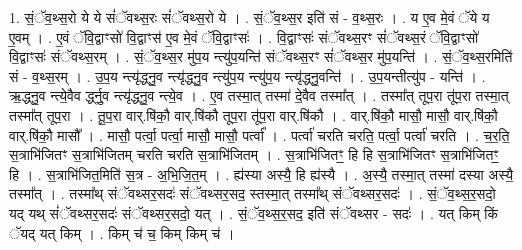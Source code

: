 \documentclass[17pt]{extarticle}
\begin{document}
1. सं॒ॅव॒थ्स॒रो ये ये सं॑ॅवथ्स॒रः सं॑ॅवथ्स॒रो ये । . सं॒ॅव॒थ्स॒र इति॑ सं - व॒थ्स॒रः । . य ए॒व मे॒वं ॅये य ए॒वम् । . ए॒वं ॅवि॒द्वाꣳसो॑ वि॒द्वाꣳस॑ ए॒व मे॒वं ॅवि॒द्वाꣳसः॑ । . वि॒द्वाꣳसः॑ संॅवथ्स॒रꣳ सं॑ॅवथ्स॒रं ॅवि॒द्वाꣳसो॑ वि॒द्वाꣳसः॑ संॅवथ्स॒रम् । . सं॒ॅव॒थ्स॒र मु॑प॒य न्त्यु॑प॒यन्ति॑ संॅवथ्स॒रꣳ सं॑ॅवथ्स॒र मु॑प॒यन्ति॑ । . सं॒ॅव॒थ्स॒रमिति॑ सं - व॒थ्स॒रम् । . उ॒प॒य न्त्यृ॑द्ध्नु॒व न्त्यृ॑द्ध्नु॒व न्त्यु॑प॒य न्त्यु॑प॒य न्त्यृ॑द्ध्नु॒वन्ति॑ । . उ॒प॒यन्तीत्यु॑प - यन्ति॑ । . ऋ॒द्ध्नु॒व न्त्ये॒वैव र्द्ध्नु॒व न्त्यृ॑द्ध्नु॒व न्त्ये॒व । . ए॒व तस्मा॒त् तस्मा॑ दे॒वैव तस्मा᳚त् । . तस्मा᳚त् तूप॒रा तू॑प॒रा तस्मा॒त् तस्मा᳚त् तूप॒रा । . तू॒प॒रा वार्.षि॑कौ॒ वार्.षि॑कौ तूप॒रा तू॑प॒रा वार्.षि॑कौ । . वार्.षि॑कौ॒ मासौ॒ मासौ॒ वार्.षि॑कौ॒ वार्.षि॑कौ॒ मासौ᳚ । . मासौ॒ पर्त्वा॒ पर्त्वा॒ मासौ॒ मासौ॒ पर्त्वा᳚ । . पर्त्वा॑ चरति चरति॒ पर्त्वा॒ पर्त्वा॑ चरति । . च॒र॒ति॒ स॒त्राभि॑जितꣳ स॒त्राभि॑जितम् चरति चरति स॒त्राभि॑जितम् । . स॒त्राभि॑जितꣳ॒॒ हि हि स॒त्राभि॑जितꣳ स॒त्राभि॑जितꣳ॒॒ हि । . स॒त्राभि॑जित॒मिति॑ स॒त्र - अ॒भि॒जि॒त॒म् । . ह्य॑स्या अस्यै॒ हि ह्य॑स्यै । . अ॒स्यै॒ तस्मा॒त् तस्मा॑ दस्या अस्यै॒ तस्मा᳚त् । . तस्मा᳚थ् संॅवथ्सर॒सदः॑ संॅवथ्सर॒सद॒ स्तस्मा॒त् तस्मा᳚थ् संॅवथ्सर॒सदः॑ । . सं॒ॅव॒थ्स॒र॒सदो॒ यद् यथ् सं॑ॅवथ्सर॒सदः॑ संॅवथ्सर॒सदो॒ यत् । . सं॒ॅव॒थ्स॒र॒सद॒ इति॑ संॅवथ्सर - सदः॑ । . यत् किम् किं ॅयद् यत् किम् । . किम् च॑ च॒ किम् किम् च॑ । \newline
\end{document}
